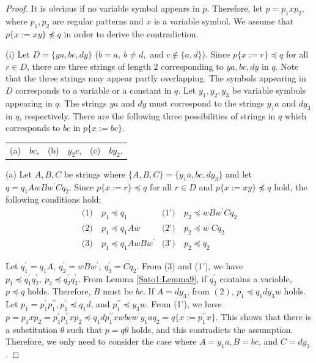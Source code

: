 \begin{proof}
  It is obvious if no variable symbol appears in $p$.
  Therefore, let $p=p_{1}xp_{2}$, where $p_{1}, p_{2}$ are regular patterns and $x$ is a variable symbol. We assume that $p \{ x := xy \} \not \preceq q$ in order to derive the contradiction.
  
\noindent\textrm{(i)}
Let $D=\{ ya, bc, dy \}$ ($b = a,~b \not= d,\mbox{~and~}c \not\in \{a,d\}$).
Since $p \{ x := r \} \preceq q$ for all $r \in D$, there are three strings of length $2$ corresponding to $ya, bc, dy$ in $q$. Note that the three strings may appear partly overlapping.
The symbols appearing in $D$ corresponds to a variable or a constant in $q$.
Let $y_{1}, y_{2}, y_{3}$ be variable symbols appearing in $q$.
The strings $ya$ and $dy$ must correspond to the strings $y_{1}a$ and $dy_{3}$ in $q$, respectively.
There are the following three possibilities of strings in $q$ which corresponds to $bc$ in $p\{x:=bc\}$.
\begin{center}
\begin{tabular}{cccccc}
\textrm{(a)} & $bc$, &
\textrm{(b)} & $y_{2}c$, &
\textrm{(c)} & $by_{2}$.
\end{tabular}
\end{center}

\textrm{(a)}
Let $A,B,C$ be strings where $\{ A,B,C \} = \{ y_{1}a,bc,dy_{3} \}$ and let $q=q_{1}AwBw^{\prime}Cq_{2}$.
Since $p \{ x := r \} \preceq q$ for all $r \in D$ and $p \{ x := xy \} \not \preceq q$ hold, the following conditions hold:
\begin{align*}
  \textrm{(1)}~& p_{1} \preceq q_{1} & \textrm{(1')}~& p_{2} \preceq wBw^{\prime}Cq_{2} \\
  \textrm{(2)}~& p_{1} \preceq q_{1}Aw & \textrm{(2')}~& p_{2} \preceq w^{\prime}Cq_{2} \\
  \textrm{(3)}~& p_{1} \preceq q_{1}AwBw^{\prime} & \textrm{(3')}~& p_{2} \preceq q_{2}
\end{align*}

Let $q^{\prime}_{1}=q_{1}A,~q^{\prime}_{2}=wBw^{\prime},~q^{\prime}_{3}=Cq_{2}$.
From (3) and (1'), we have $p_{1} \preceq q^{\prime}_{1}q^{\prime}_{2},~p_{2} \preceq q^{\prime}_{2}q^{\prime}_{3}$.
From Lemma \ref{Sato1:Lemma9}, if $q^{\prime}_{2}$ contains a variable, $p \preceq q$ holds.
Therefore, $B$ must be $bc$.
If $A=dy_{3}$, from $(2)$, $p_{1} \preceq q_{1}dy_{3}w$ holds.
Let $p_{1}=p^{\prime}_{1}p^{\prime\prime}_{1}, p^{\prime}_{1} \preceq q_{1}d$, and $p^{\prime\prime}_{1} \preceq y_{3}w$.
From (1'), we have $p=p_{1}xp_{2}=p^{\prime}_{1}p^{\prime\prime}_{1}xp_{2} \preceq q_{1}dp^{\prime\prime}_{1}xwbcw^{\prime}y_{1}aq_{2}=q \{ x:=p^{\prime\prime}_{1}x \}$. This shows that there is a substitution $\theta$ such that $p=q\theta$ holds, and this contradicts the assumption. Therefore, we only need to consider the case where $A=y_{1}a,B=bc$, and $C=dy_{3}$.


\end{proof}
